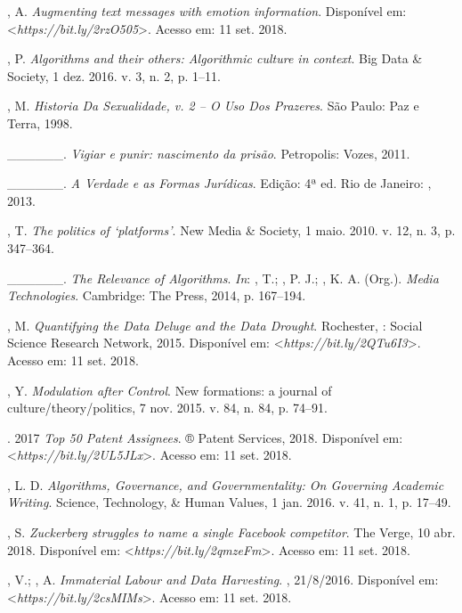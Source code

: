 \begin{Parskip}
, A. \emph{Augmenting text messages with emotion information}.
Disponível em: \textless{}\emph{https://bit.ly/2rzO505}\textgreater{}. Acesso em: 11 set. 2018.

, P. \emph{Algorithms and their others: Algorithmic culture in
context}. Big Data \& Society, 1 dez. 2016. v. 3, n. 2, p. 1--11.

, M. \emph{Historia Da Sexualidade, v. 2 -- O Uso Dos Prazeres}.
São Paulo: Paz e Terra, 1998.

\_\_\_\_\_\_. \emph{Vigiar e punir: nascimento da prisão}. Petropolis:
Vozes, 2011.

\_\_\_\_\_\_. \emph{A Verdade e as Formas Jurídicas}. Edição:
4ª ed. Rio de Janeiro: , 2013.

, T. \emph{The politics of `platforms'}. New Media \&
Society, 1 maio. 2010. v. 12, n. 3, p. 347--364.

\_\_\_\_\_\_. \emph{The Relevance of Algorithms}. \emph{In}:
, T.; , P. J.; , K. A. (Org.). \emph{Media
Technologies}. Cambridge: The  Press, 2014, p. 167--194.

, M. \emph{Quantifying the Data Deluge and the Data Drought}.
Rochester, : Social Science Research Network, 2015. Disponível em:
\textless{}\emph{https://bit.ly/2QTu6I3}\textgreater{}. Acesso em: 11 set. 2018.

, Y. \emph{Modulation after Control}. New formations: a journal of
culture/theory/politics, 7 nov. 2015. v. 84, n. 84, p. 74--91.

. 2017 \emph{Top 50  Patent Assignees}. ® Patent
Services, 2018. Disponível em: \textless{}\emph{https://bit.ly/2UL5JLx}\textgreater{}. Acesso em: 11 set. 2018.

, L. D. \emph{Algorithms, Governance, and Governmentality: On
Governing Academic Writing}. Science, Technology, \& Human
Values, 1 jan. 2016. v. 41, n. 1, p. 17--49.

, S. \emph{Zuckerberg struggles to name a single Facebook
competitor}. The Verge, 10 abr. 2018. Disponível em: \textless{}\emph{https://bit.ly/2qmzeFm}\textgreater{}. Acesso em: 11 set. 2018.

, V.; , A. \emph{Immaterial Labour and Data Harvesting}.
, 21/8/2016. Disponível em: \textless{}\emph{https://bit.ly/2csMIMs}\textgreater{}. Acesso em: 11 set. 2018.


\end{Parskip}
